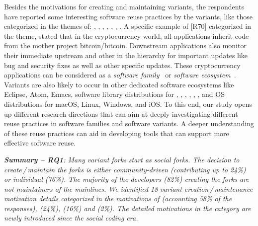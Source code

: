 Besides the motivations for creating and maintaining variants, the respondents have reported some interesting software reuse practices by the variants, like those categorized in the themes of: , , , , , , . A specific example of [R70] categorized in the  theme, stated that in the cryptocurrency world, all applications inherit code from the mother project \textsf{bitcoin/bitcoin}. Downstream applications also monitor their immediate upstream and other in the hierarchy for important updates like bug and security fixes as well as other specific updates. These cryptocurrency applications can be considered as a \textit{software family}~\cite{businge:2018icsme} or \textit{software ecosystem}~\cite{Decan:2019:emse}. %
Variants are also likely to occur in other dedicated software ecosystems like \textsf{Eclipse}, \textsf{Atom}, \textsf{Emacs}, software library distributions for  \java, \cp, \cpp, \py, \go, \rb, and OS distributions for \textsf{macOS}, \textsf{Linux}, \textsf{Windows}, and \textsf{iOS}.
To this end, our study opens up different research directions that can aim at deeply investigating different reuse practices in software families and software variants. A deeper understanding of these reuse practices can aid in developing tools that can support more effective software reuse.

\begin{custombox}
\emph{\textbf{Summary -- RQ1}:
Many variant forks start as social forks. The decision to create\,/\,maintain the forks is either community-driven (contributing up to 24\%) or individual (76\%). The majority  of the developers (82\%) creating the forks are not maintainers of the mainlines. We  identified 18 variant creation\,/\,maintenance motivation details categorized in the motivations of  (accounting 58\% of the responses),  (24\%),  (16\%) and  (2\%). The detailed motivations in the  category are newly introduced since the social coding era.
}
\end{custombox}


